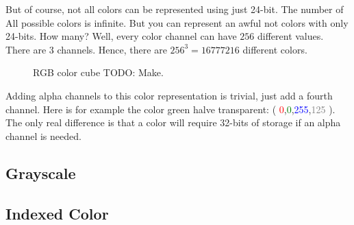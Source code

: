 \begin{refsection}
  But of course, not all colors can be represented using just
  24-bit. The number of All possible colors is infinite. But you can
  represent an awful not colors with only 24-bits. How many? Well, every
  color channel can have $256$ different values. There are $3$
  channels. Hence, there are $256^3 = 16777216$ different colors.

  \begin{figure}[h!]
    \centering
    \caption{RGB color cube TODO: Make.}
    \label{fig:color-cube}
  \end{figure}

  \newcommand{\rgbaquad}[4]{(
    \textcolor{red}{#1},\textcolor{green}{#2},\textcolor{blue}{#3},\textcolor{gray}{#4} )}

  Adding alpha channels to this color representation is trivial, just
  add a fourth channel. Here is for example the color green halve
  transparent: \rgbaquad{0}{0}{255}{125}. The only real difference is
  that a color will require 32-bits of storage if an alpha channel is needed.

  \subsection{Grayscale}
  \label{sec:other-colors-depths}


  \subsection{Indexed Color}
  \label{sec:indexed-color}


  \printbibliography[heading=subbibliography]
\end{refsection}